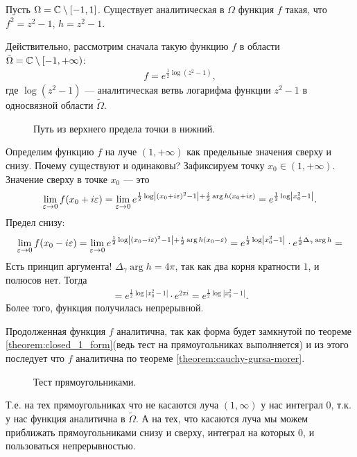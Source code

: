 \documentclass[../complex-analysis.tex]{subfiles}
\begin{document}
\begin{exmpl}
 Пусть $ \Omega = \mathbb{C} \setminus [-1, 1] $. Существует аналитическая в $ \Omega $ функция $ f $ такая, что $ f^{2} = z^{2} - 1 $, $ h = z^{2}-1 $.

 Действительно,  рассмотрим сначала такую функцию $ f $ в области $ \tilde \Omega  = \mathbb{C} \setminus [-1, +\infty)$:
 \begin{align*}
  f = e^{\frac{1}{2}\log(z^{2} - 1)},
 \end{align*} где $ \log(z^{2} - 1) $ --- аналитическая ветвь логарифма функции $ z^{2}-1 $ в односвязной области $ \tilde \Omega $.

\begin{figure}[ht]
    \centering
    \caption{Путь из верхнего предела точки в нижний.}
    \label{fig:example_analytic_square_path}
\end{figure}

 Определим функцию $ f $ на луче $ (1, +\infty) $ как предельные значения сверху и снизу. Почему существуют и одинаковы? Зафиксируем точку $ x_0 \in (1, +\infty) $. Значение сверху в точке $ x_0 $ --- это
 \begin{align*}
  \lim_{\varepsilon \to 0} f(x_0 + i\varepsilon) = \lim_{\varepsilon \to 0} e^{\frac{1}{2}\log \left| (x_0+i\varepsilon)^{2} - 1 \right| + \frac{i}{2}\arg h(x_0 + i\varepsilon)} = e^{\frac{1}{2}\log \left| x_0^{2}-1 \right|}.
 \end{align*} Предел снизу:
 \begin{align*}
  \lim_{\varepsilon \to 0} f(x_0 - i\varepsilon) = \lim_{\varepsilon \to 0} e^{\frac{1}{2} \log \left| (x_0 -i\varepsilon)^{2}-1 \right| + \frac{i}{2}\arg h(x_0-\varepsilon)} = e^{\frac{1}{2} \log \left| x_0^{2}-1 \right|} \cdot e^{\frac{i}{2} \Delta_\gamma \arg h} =
 \end{align*} Есть принцип аргумента! $ \Delta_{\gamma} \arg h = 4\pi $, так как два корня кратности $ 1 $, и полюсов нет. Тогда
 \begin{align*}
  = e^{\frac{1}{2}\log \left| x_0^{2}-1 \right|} \cdot e^{2\pi i} = e^{\frac{1}{2} \log \left| x_0^{2}-1 \right|}.
 \end{align*} Более того, функция получилась непрерывной.

 Продолженная функция $ f $ аналитична, так как форма будет замкнутой по теореме \eqref{theorem:closed_1_form}(ведь тест на прямоугольниках выполняется) и из этого последует что $f$ аналитична по теореме \eqref{theorem:cauchy-gursa-morer}.

\begin{figure}[ht]
    \centering
    \caption{Тест прямоугольниками.}
    \label{fig:rectangle_test_example_analytic_square}
\end{figure}

Т.е. на тех прямоугольниках что не касаются луча $(1, \infty)$ у нас интеграл 0, т.к. у нас функция аналитична в $\tilde \Omega$.
А на тех, что касаются луча мы можем приближать прямоугольниками снизу и сверху, интеграл на которых 0, и пользоваться непрерывностью.

\end{exmpl}
\end{document}
